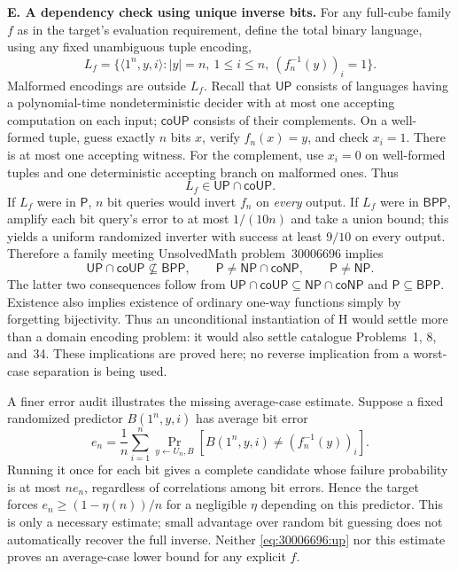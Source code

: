 \documentclass[11pt,a4paper]{article}
\numberwithin{equation}{section}
\begin{document}
\medskip{}
\textbf{E. A dependency check using unique inverse bits.}
For any full-cube family $f$ as in the target's evaluation requirement,
define the total binary language, using any fixed unambiguous tuple
encoding,
\[
 L_f=\{\langle1^n,y,i\rangle: |y|=n,\ 1\le i\le n,
                         \ (f_n^{-1}(y))_i=1\}.
\]
Malformed encodings are outside $L_f$. Recall that $\mathsf{UP}$ consists
of languages having a polynomial-time nondeterministic decider with at
most one accepting computation on each input; $\mathsf{coUP}$ consists
of their complements.
On a well-formed tuple, guess exactly $n$ bits $x$, verify $f_n(x)=y$,
and check $x_i=1$. There is at most one accepting witness. For the
complement, use $x_i=0$ on well-formed tuples and one deterministic
accepting branch on malformed ones. Thus
\begin{equation}\label{eq:30006696:up}
 L_f\in\mathsf{UP}\cap\mathsf{coUP}.
\end{equation}
If $L_f$ were in $\mathsf P$, $n$ bit queries would invert $f_n$ on
\emph{every} output. If $L_f$ were in $\mathsf{BPP}$, amplify each bit
query's error to at most $1/(10n)$ and take a union bound; this yields a
uniform randomized inverter with success at least $9/10$ on every
output. Therefore a family meeting UnsolvedMath problem~30006696 implies
\[
 \mathsf{UP}\cap\mathsf{coUP}\not\subseteq\mathsf{BPP},
 \qquad
 \mathsf P\ne\mathsf{NP}\cap\mathsf{coNP},
 \qquad \mathsf P\ne\mathsf{NP}.
\]
The latter two consequences follow from
$\mathsf{UP}\cap\mathsf{coUP}\subseteq\mathsf{NP}\cap\mathsf{coNP}$
and $\mathsf P\subseteq\mathsf{BPP}$. Existence also implies existence
of ordinary one-way functions simply by forgetting bijectivity.
Thus an unconditional instantiation of H would settle more than a domain
encoding problem: it would also settle catalogue Problems~1, 8, and~34.
These implications are proved here; no reverse implication from a
worst-case separation is being used.

A finer error audit illustrates the missing average-case estimate.
Suppose a fixed randomized predictor $B(1^n,y,i)$ has average bit error
\[
 e_n=\frac1n\sum_{i=1}^n
      \Pr_{y\leftarrow U_n,B}[B(1^n,y,i)\ne(f_n^{-1}(y))_i].
\]
Running it once for each bit gives a complete candidate whose failure
probability is at most $n e_n$, regardless of correlations among bit
errors. Hence the target forces
$e_n\ge(1-\eta(n))/n$ for a negligible $\eta$ depending on this
predictor. This is only a necessary estimate; small advantage over
random bit guessing does not automatically recover the full inverse.
Neither \eqref{eq:30006696:up} nor this estimate proves an average-case lower
bound for any explicit $f$.
\end{document}
